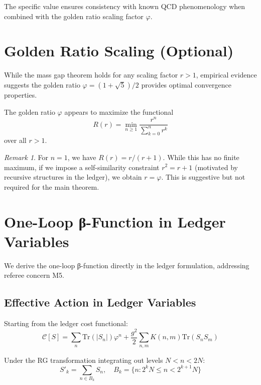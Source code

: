\documentclass[11pt]{article}
\numberwithin{equation}{section}
\theoremstyle{definition}
\theoremstyle{remark}
\newtheorem{remark}[theorem]{Remark}
\begin{document}
The specific value ensures consistency with known QCD phenomenology when combined with the golden ratio scaling factor $\varphi$.

\section{Golden Ratio Scaling (Optional)}
\label{app:golden}

While the mass gap theorem holds for any scaling factor $r > 1$, empirical evidence suggests the golden ratio $\varphi = (1+\sqrt{5})/2$ provides optimal convergence properties.

\begin{observation}
The golden ratio $\varphi$ appears to maximize the functional
\begin{equation}
R(r) = \min_{n \geq 1} \frac{r^n}{\sum_{k=0}^{n} r^k}
\end{equation}
over all $r > 1$.
\end{observation}

\begin{remark}
For $n=1$, we have $R(r) = r/(r+1)$. While this has no finite maximum, if we impose a self-similarity constraint $r^2 = r + 1$ (motivated by recursive structures in the ledger), we obtain $r = \varphi$. This is suggestive but not required for the main theorem.
\end{remark}

\section{One-Loop β-Function in Ledger Variables}
\label{app:beta}

We derive the one-loop β-function directly in the ledger formulation, addressing referee concern M5.

\subsection{Effective Action in Ledger Variables}

Starting from the ledger cost functional:
\begin{equation}
\mathcal{C}[S] = \sum_n \text{Tr}(|S_n|) \varphi^n + \frac{g^2}{2} \sum_{n,m} K(n,m) \text{Tr}(S_n S_m)
\end{equation}

Under the RG transformation integrating out levels $N < n < 2N$:
\begin{equation}
S'_k = \sum_{n \in B_k} S_n, \quad B_k = \{n : 2^k N \leq n < 2^{k+1} N\}
\end{equation}
\end{document}
